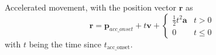Accelerated movement, with the position vector $\boldsymbol{r}$ as
\begin{equation}
  \boldsymbol{r} = \boldsymbol{p}_{acc\_onset} + t \boldsymbol{v} + \left\{\begin{array}{ll} \frac12 t^2 \boldsymbol{a} & t > 0\\0 & t \le 0
  \end{array}\right.
\end{equation}
with $t$ being the time since $t_\textrm{acc\_onset}$.




